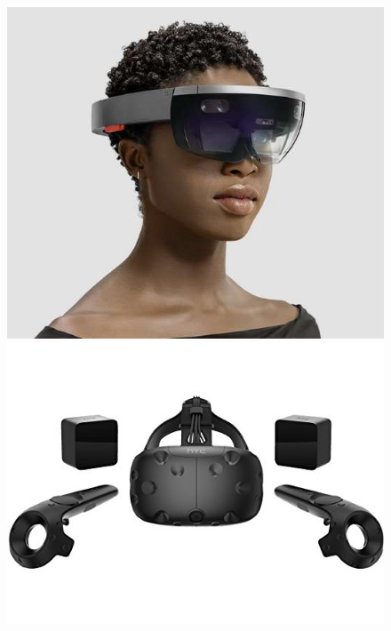 \begin{figure}[hb]
    \centering
    \begin{minipage}{0.3\textwidth}
        \includegraphics[width=.9\linewidth]{figures/Microsoft2018_HoloLens_worn}
    \end{minipage}%
    \hfill
    \begin{minipage}{0.45\textwidth}
        \includegraphics[width=.9\linewidth]{figures/htc_vive}
    \end{minipage}%
    \hfill
    \begin{minipage}{0.25\textwidth}

\end{minipage}
\end{figure}
